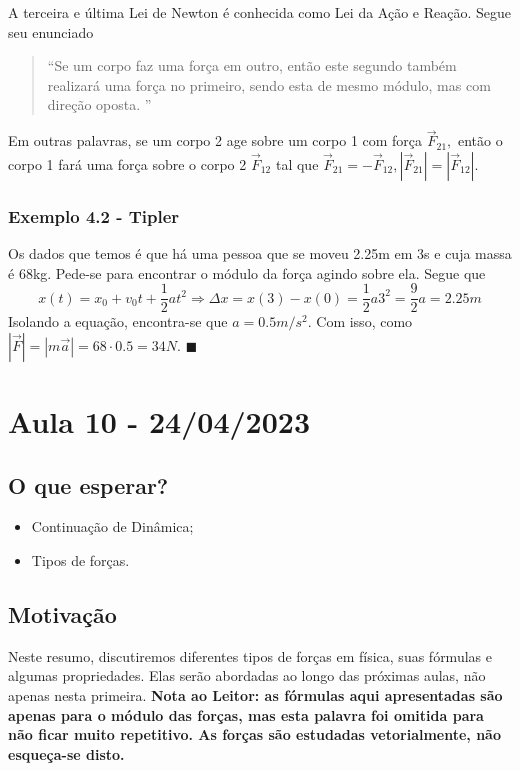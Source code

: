 \documentclass{article}
\renewcommand\qedsymbol{$\blacksquare$}
\begin{document}
  A terceira e \'ultima Lei de Newton \'e conhecida como Lei da A\c c\~ao e Rea\c c\~ao. Segue seu enunciado
 \begin{quote}
   ``Se um corpo faz uma for\c ca em outro, ent\~ao este segundo tamb\'em realizar\'a uma for\c ca no primeiro, sendo esta de
   mesmo m\'odulo, mas com dire\c c\~ao oposta. ''
 \end{quote}
  Em outras palavras, se um corpo 2 age sobre um corpo 1 com for\c ca $\vec{F}_{21},$ ent\~ao o corpo 1 far\'a uma for\c ca sobre
  o corpo 2 $\vec{F}_{12}$ tal que $\vec{F}_{21} = -\vec{F}_{12}, |\vec{F}_{21}| = |\vec{F}_{12}|$.

  \subsubsection{Exemplo 4.2 - Tipler}
  Os dados que temos \'e que h\'a uma pessoa que se moveu 2.25m em 3s e cuja massa \'e 68kg. Pede-se para encontrar o m\'odulo da for\c ca
agindo sobre ela. Segue que 
  $$
    x(t) = x_{0} + v_{0}t + \frac{1}{2}at^{2} \Rightarrow \Delta x = x(3) - x(0) = \frac{1}{2}a3^{2} = \frac{9}{2}a = 2.25m
  $$
  Isolando a equa\c c\~ao, encontra-se que $a = 0.5m/s^{2}.$ Com isso, como $|\vec{F}| = |m \vec{a}| = 68 \cdot 0.5 = 34N$. \qedsymbol
\newpage

\section{Aula 10 - 24/04/2023}
\subsection{O que esperar?}
\begin{itemize}
  \item Continua\c c\~ao de Din\^amica;
  \item Tipos de for\c cas.
\end{itemize}
\subsection{Motiva\c c\~ao}
Neste resumo, discutiremos diferentes tipos de forças em física, suas fórmulas e algumas propriedades. Elas ser\~ao abordadas ao longo
das pr\'oximas aulas, n\~ao apenas nesta primeira. \textbf{Nota ao Leitor: as f\'ormulas aqui apresentadas s\~ao apenas
para o m\'odulo das for\c cas, mas esta palavra foi omitida para n\~ao ficar muito repetitivo. As for\c cas s\~ao estudadas vetorialmente,
n\~ao esque\c ca-se disto.}
\end{document}
